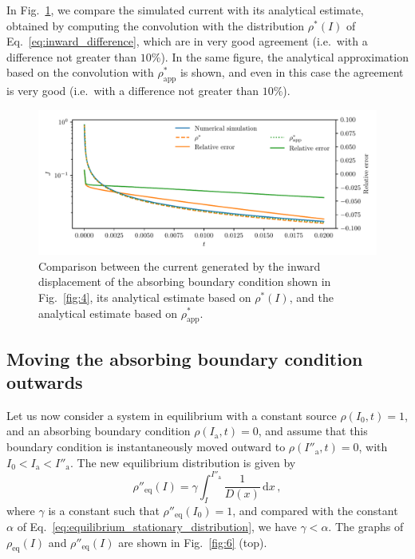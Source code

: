 {In Fig.~\ref{fig:5}, we compare the simulated current with its analytical estimate, obtained by computing the convolution with the distribution $\rho^\ast(I)$ of Eq.~\eqref{eq:inward_difference}, which are in very good agreement {(i.e.\ with a difference not greater than $10\%$)}. In the same figure, the analytical approximation based on the convolution with $\rho^\ast_\text{app}$ is shown, and even in this case the agreement is very good {(i.e.\ with a difference not greater than $10\%$)}.

\begin{figure}[t]
    \centering
    \includegraphics[width=\textwidth]{4_probing_the_diffusive_behavior/figs/final/current_backwards.pdf}
    \caption{Comparison between the current generated by the inward displacement of the absorbing boundary condition shown in Fig.~\ref{fig:4}, its analytical estimate based on $\rho^\ast(I)$, and the analytical estimate based on $\rho^\ast_\text{app}$.}
    \label{fig:5}
\end{figure}


\subsection{Moving the absorbing boundary condition outwards}


Let us now consider a system in equilibrium with a constant source $\rho(I_0, t)=1$, and an absorbing boundary condition $\rho(I_\mathrm{a}, t)=0$, and assume that this boundary condition is instantaneously moved outward to $\rho(I''_\mathrm{a}, t)=0$, with $I_0 < I_\mathrm{a} < I''_\mathrm{a}$. The new equilibrium distribution is given by
\begin{equation}
    \rho''_\text{eq}(I) = \gamma \int_I^{I''_\mathrm{a}} \frac{1}{D(x)}\,\mathrm{d}x\,,
\end{equation}
where $\gamma$ is a constant such that $\rho''_\text{eq}(I_0)=1$, and compared with the constant $\alpha$ of Eq.~\eqref{eq:equilibrium_stationary_distribution}, we have $\gamma < \alpha$. The graphs of $\rho_\text{eq}(I)$ and $\rho''_\text{eq}(I)$ are shown in Fig.~\ref{fig:6} (top). 

}
